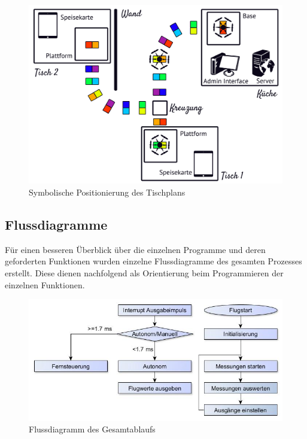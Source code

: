   \begin{figure}[H]
  \begin{centering}
    \includegraphics[width = \textwidth]{Bilder/bor_ablaufbild}
  \par\end{centering}
  \caption{Symbolische Positionierung des Tischplans}
  \label{Ultraschallsensor}
\end{figure}

  \subsection{Flussdiagramme}
  Für einen besseren Überblick über die einzelnen Programme und deren geforderten Funktionen wurden einzelne Flussdiagramme des gesamten Prozesses erstellt.
  Diese dienen nachfolgend als Orientierung beim Programmieren der einzelnen Funktionen.

  \begin{figure}[H]
    \begin{centering}
      \includegraphics[width = \textwidth]{Bilder/Flussdiagramm}
    \par\end{centering}
    \caption{Flussdiagramm des Gesamtablaufs}
    \label{Flussdiragramm}
  \end{figure}

